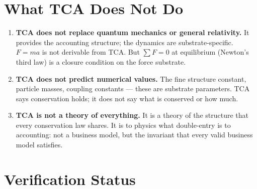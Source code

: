 \documentclass[11pt]{article}
\begin{document}
\section{What TCA Does Not Do}

\begin{enumerate}[leftmargin=2em]
\item \textbf{TCA does not replace quantum mechanics or general
  relativity.} It provides the accounting structure; the dynamics
  are substrate-specific. $F = ma$ is not derivable from TCA.
  But $\sum F = 0$ at equilibrium (Newton's third law) is a closure
  condition on the force substrate.

\item \textbf{TCA does not predict numerical values.} The fine
  structure constant, particle masses, coupling constants --- these
  are substrate parameters. TCA says conservation holds; it does
  not say what is conserved or how much.

\item \textbf{TCA is not a theory of everything.} It is a theory
  of the structure that every conservation law shares. It is to
  physics what double-entry is to accounting: not a business model,
  but the invariant that every valid business model satisfies.
\end{enumerate}

\section{Verification Status}
\end{document}
